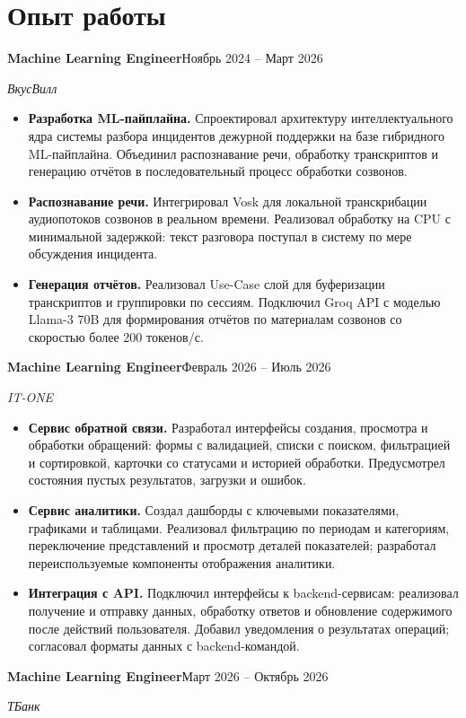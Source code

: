 \documentclass[a4paper,11pt]{article}
\newcommand{\entry}[3]{\textbf{#1}\hfill #3\par\textit{#2}\par}
\begin{document}
\section*{Опыт работы}
\entry{Machine Learning Engineer}{ВкусВилл}{Ноябрь 2024 -- Март 2026}
\begin{itemize}
\item \textbf{Разработка ML-пайплайна.} Спроектировал архитектуру интеллектуального ядра системы разбора инцидентов дежурной поддержки на базе гибридного ML-пайплайна. Объединил распознавание речи, обработку транскриптов и генерацию отчётов в последовательный процесс обработки созвонов.
\item \textbf{Распознавание речи.} Интегрировал Vosk для локальной транскрибации аудиопотоков созвонов в реальном времени. Реализовал обработку на CPU с минимальной задержкой: текст разговора поступал в систему по мере обсуждения инцидента.
\item \textbf{Генерация отчётов.} Реализовал Use-Case слой для буферизации транскриптов и группировки по сессиям. Подключил Groq API с моделью Llama-3 70B для формирования отчётов по материалам созвонов со скоростью более 200 токенов/с.
\end{itemize}
\vspace{4pt}
\entry{Machine Learning Engineer}{IT-ONE}{Февраль 2026 -- Июль 2026}
\begin{itemize}
\item \textbf{Сервис обратной связи.} Разработал интерфейсы создания, просмотра и обработки обращений: формы с валидацией, списки с поиском, фильтрацией и сортировкой, карточки со статусами и историей обработки. Предусмотрел состояния пустых результатов, загрузки и ошибок.
\item \textbf{Сервис аналитики.} Создал дашборды с ключевыми показателями, графиками и таблицами. Реализовал фильтрацию по периодам и категориям, переключение представлений и просмотр деталей показателей; разработал переиспользуемые компоненты отображения аналитики.
\item \textbf{Интеграция с API.} Подключил интерфейсы к backend-сервисам: реализовал получение и отправку данных, обработку ответов и обновление содержимого после действий пользователя. Добавил уведомления о результатах операций; согласовал форматы данных с backend-командой.
\end{itemize}
\vspace{4pt}
\entry{Machine Learning Engineer}{ТБанк}{Март 2026 -- Октябрь 2026}
\end{document}
